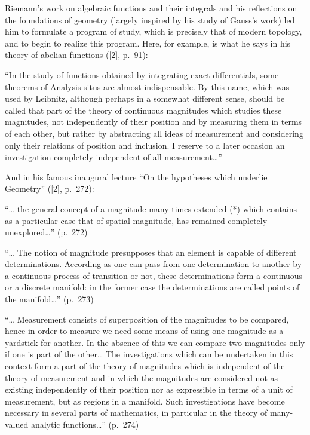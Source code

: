 Riemann's work on algebraic functions and their integrals and his reflections on the foundations of geometry (largely inspired by his study of Gauss's work) led him to formulate a program of study, which is precisely that of modern topology, and to begin to realize this program. Here, for example, is what he says in his theory of abelian functions ({[}2{]}, p.~91):

``In the study of functions obtained by integrating exact differentials, some theorems of Analysis situs are almost indispensable. By this name, which was used by Leibnitz, although perhaps in a somewhat different sense, should be called that part of the theory of continuous magnitudes which studies these magnitudes, not independently of their position and by measuring them in terms of each other, but rather by abstracting all ideas of measurement and considering only their relations of position and inclusion. I reserve to a later occasion an investigation completely independent of all measurement\ldots{}''

And in his famous inaugural lecture ``On the hypotheses which underlie Geometry'' ({[}2{]}, p.~272):

``\ldots{} the general concept of a magnitude many times extended (*) which contains as a particular case that of spatial magnitude, has remained completely unexplored\ldots'' (p.~272)

``\ldots{} The notion of magnitude presupposes that an element is capable of different determinations. According as one can pass from one determination to another by a continuous process of transition or not, these determinations form a continuous or a discrete manifold: in the former case the determinations are called points of the manifold\ldots'' (p.~273)

``\ldots{} Measurement consists of superposition of the magnitudes to be compared, hence in order to measure we need some means of using one magnitude as a yardstick for another. In the absence of this we can compare two magnitudes only if one is part of the other\ldots{} The investigations which can be undertaken in this context form a part of the theory of magnitudes which is independent of the theory of measurement and in which the magnitudes are considered not as existing independently of their position nor as expressible in terms of a unit of measurement, but as regions in a manifold. Such investigations have become necessary in several parts of mathematics, in particular in the theory of many-valued analytic functions\ldots'' (p.~274)

